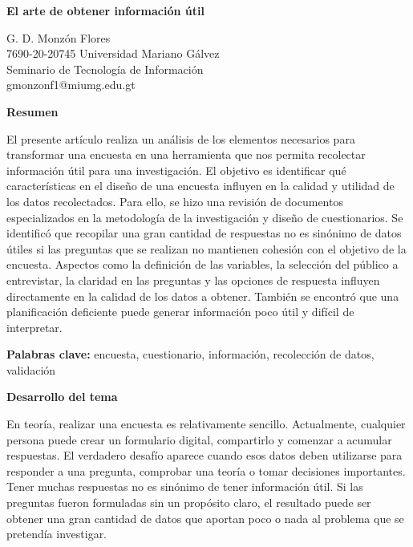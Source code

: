 \documentclass[12pt,letterpaper]{article}
\begin{document}

\begin{center}
    {\large\textbf{El arte de obtener información útil}}

    \vspace{0.3cm}
    G. D. Monzón Flores\\
    7690-20-20745 Universidad Mariano Gálvez\\[0.15cm]

    Seminario de Tecnología de Información\\
    gmonzonf1@miumg.edu.gt
\end{center}


\textbf{Resumen}

El presente artículo realiza un análisis de los elementos necesarios para transformar una encuesta en una herramienta que nos permita recolectar información útil para una investigación. El objetivo es identificar qué características en el diseño de una encuesta influyen en la calidad y utilidad de los datos recolectados. Para ello, se hizo una revisión de documentos especializados en la metodología de la investigación y diseño de cuestionarios. Se identificó que recopilar una gran cantidad de respuestas no es sinónimo de datos útiles si las preguntas que se realizan no mantienen cohesión con el objetivo de la encuesta. Aspectos como la definición de las variables, la selección del público a entrevistar, la claridad en las preguntas y las opciones de respuesta influyen directamente en la calidad de los datos a obtener. También se encontró que una planificación deficiente puede generar información poco útil y difícil de interpretar.

\textbf{Palabras clave:} encuesta, cuestionario, información, recolección de datos, validación


\textbf{Desarrollo del tema}

En teoría, realizar una encuesta es relativamente sencillo. Actualmente, cualquier persona puede crear un formulario digital, compartirlo y comenzar a acumular respuestas. El verdadero desafío aparece cuando esos datos deben utilizarse para responder a una pregunta, comprobar una teoría o tomar decisiones importantes. Tener muchas respuestas no es sinónimo de tener información útil. Si las preguntas fueron formuladas sin un propósito claro, el resultado puede ser obtener una gran cantidad de datos que aportan poco o nada al problema que se pretendía investigar.
\end{document}

